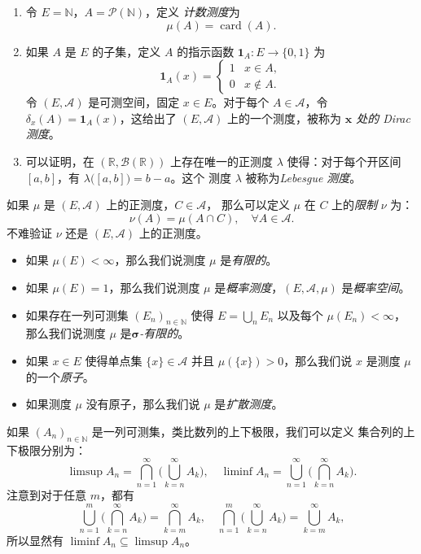 \documentclass[fontset=none]{Notes}
\DeclareMathOperator\card{card}
\begin{document}
\begin{example}[常见的测度]
  \mbox{}
  \begin{enumerate}
    \item 令 $E=\mathbb{N}$，$A=\mathcal{P}(\mathbb{N})$，定义%
    \emph{计数测度}为
    \[
      \mu(A)=\card(A).  
    \]
    \item 如果 $A$ 是 $E$ 的子集，定义 $A$ 的指示函数 $\mathbf{1}_A:E\to\{0,1\}$
    为
    \[
      \mathbf{1}_A(x)=\begin{cases}
        1 & x\in A,\\
        0 & x\notin A.
      \end{cases}  
    \]
    令 $(E,\mathcal{A})$ 是可测空间，固定 $x\in E$。对于每个 $A\in \mathcal{A}$，令
    $\delta_x(A)=\mathbf{1}_A(x)$，这给出了 $(E,\mathcal{A})$ 上的一个测度，被称为
    \emph{$\mathbold x$ 处的 Dirac 测度}。
    \item 可以证明，在 $(\mathbb{R},\mathcal{B}(\mathbb{R}))$ 上存在唯一的正测度 $\lambda$
    使得：对于每个开区间 $[a,b]$，有 $\lambda\bigl([a,b]\bigr)=b-a$。这个
    测度 $\lambda$ 被称为\emph{Lebesgue 测度}。
  \end{enumerate}
\end{example}

如果 $\mu$ 是 $(E,\mathcal{A})$ 上的正测度，$C\in \mathcal{A}$，
那么可以定义 $\mu$ 在 $C$ 上的\emph{限制} $\nu$ 为：
\[
  \nu(A)=\mu(A\cap C),\quad \forall A\in \mathcal{A}.
\]
不难验证 $\nu$ 还是 $(E,\mathcal{A})$ 上的正测度。

\begin{definition}
  \mbox{}
  \begin{itemize}[nosep]
    \item 如果 $\mu(E)<\infty$，那么我们说测度 $\mu$ 是\emph{有限的}。
    \item 如果 $\mu(E)=1$，那么我们说测度 $\mu$ 是\emph{概率测度}，$(E,\mathcal{A},\mu)$ 是\emph{概率空间}。
    \item 如果存在一列可测集 $(E_n)_{n\in \mathbb{N}}$ 使得 $E=\bigcup_n E_n$ 以及每个
    $\mu(E_n)<\infty$，那么我们说测度 $\mu$ 是\emph{$\mathbold\sigma$-有限的}。
    \item 如果 $x\in E$ 使得单点集 $\{x\}\in \mathcal{A}$ 并且 $\mu(\{x\})>0$，那么我们说
    $x$ 是测度 $\mu$ 的一个\emph{原子}。
    \item 如果测度 $\mu$ 没有原子，那么我们说 $\mu$ 是\emph{扩散测度}。
  \end{itemize}
\end{definition}

如果 $(A_n)_{n\in \mathbb{N}}$ 是一列可测集，类比数列的上下极限，我们可以定义
集合列的上下极限分别为：
\[
  \limsup A_n=\bigcap_{n=1}^\infty\biggl(\bigcup_{k=n}^\infty A_k\biggr),\quad
  \liminf A_n=\bigcup_{n=1}^\infty\biggl(\bigcap_{k=n}^\infty A_k\biggr).
\]
注意到对于任意 $m$，都有
\[
  \bigcup_{n=1}^m\biggl(\bigcap_{k=n}^\infty A_k\biggr)
  =\bigcap_{k=m}^\infty A_k,\quad 
  \bigcap_{n=1}^m\biggl(\bigcup_{k=n}^\infty A_k\biggr)=\bigcup_{k=m}^\infty A_k,
\]
所以显然有 $\liminf A_n\subseteq \limsup A_n$。
\end{document}
